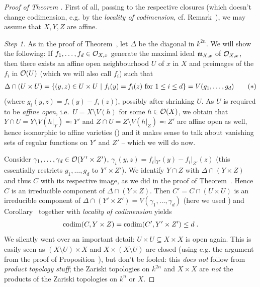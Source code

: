\documentclass[a4paper,parskip=half,numbers=enddot, DIV=12]{scrreprt}
\begin{document}
\begin{proof}[Proof of Theorem ]
	First of all, passing to the respective closures (which doesn't change codimension, e.g. by the \emph{locality of codimension}, cf. Remark~), we may assume that $X,Y,Z$ are affine.
	
    \emph{Step 1.} As in the proof of Theorem~, let $\Delta$ be the diagonal in $k^{2n}$. We will show the following: If $f_1,\ldots, f_d\in\mathcal{O}_{X,x}$ generate the maximal ideal $\mathfrak{m}_{X,x}$ of $\mathcal{O}_{X,x}$, then there exists an affine open neighbourhood $U$ of $x$ in $X$ and preimages of the $f_i$ in $\mathcal{O}(U)$ (which we will also call $f_i$) such that 
    \begin{align}\lbl{eq:conditionOnUxU}
        \Delta \cap (U\times U) = \left\{(y,z)\in U\times U \st f_i(y) = f_i(z) \text{ for } 1\leq i \leq d\right\}= V(g_1,\ldots,g_d)\tag{$*$}
    \end{align}
    (where $g_i(y,z)=f_i(y)-f_i(z)$), possibly after shrinking $U$. As $U$ is required to be \emph{affine open}, i.e.\ $U=X\setminus V(h)$ for some $h\in\mathcal{O}(X)$, we obtain that $Y\cap U=Y\setminus V(h|_Y)\eqqcolon Y'$ and $Z\cap U=Z\setminus V(h|_Z)\eqqcolon Z'$ are affine open as well, hence isomorphic to affine varieties (\cite[Proposition~2.2.4]{alg1}) and it makes sense to talk about vanishing sets of regular functions on $Y'$ and $Z'$ -- which we will do now. 
    
    Consider $\gamma_1,\ldots, \gamma_d\in\mathcal{O}(Y'\times Z')$, $\gamma_i(y,z)=f_i|_{Y'}(y)-f_i|_{Z'}(z)$ (this essentially restricts $g_1,\ldots, g_d$ to $Y'\times Z'$). We identify $Y\cap Z$ with $\Delta\cap (Y\times Z)$ and thus $C$ with its respective image, as we did in the proof of Theorem~. Hence $C$ is an irreducible component of $\Delta\cap (Y\times Z)$. Then $C'=C\cap (U\times U)$ is an irreducible component of $\Delta\cap (Y'\times Z')=V(\gamma_1,\ldots,\gamma_d)$ (here we used ) and Corollary~ together with \emph{locality of codimension} yields
    \begin{align*}
    	\operatorname{codim}(C,Y\times Z)=\operatorname{codim}(C',Y'\times Z')\leq d\;.
    \end{align*}
    We silently went over an important detail: $U\times U\subseteq X\times X$ is open again. This is easily seen as $(X\setminus U)\times X$ and $X\times (X\setminus U)$ are closed (using e.g. the argument from the proof of Proposition~), but don't be fooled: this \emph{does not} follow from \emph{product topology stuff}; the Zariski topologies on $k^{2n}$ and $X\times X$ are \emph{not} the products of the Zariski topologies on $k^n$ or $X$. 
    

\end{proof}
\end{document}
